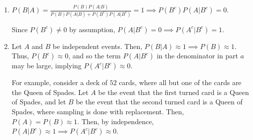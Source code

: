 \begin{enumerate}[label=(\alph*)]

\item 
$P(B|A) = \frac{P(B)P(A|B)}{P(B)P(A|B) + P(B^{c})P(A|B^{c})} = 1 \implies P(B^{c})P(A|B^{c}) = 0$.

Since $P(B^{c}) \neq 0$ by assumption, $P(A|B^{c}) = 0 \implies P(A^{c}|B^{c}) = 1$.

\item Let $A$ and $B$ be independent events. Then, $P(B|A) \approx 1 \implies P(B) \approx 1$.
Thus, $P(B^{c}) \approx 0$, and so the term $P(A|B^{c})$ in the denominator in part $a$ may be large,
implying $P(A^{c}|B^{c}) \approx 0$.

For example, consider a deck of $52$ cards, where all but one of the cards are the Queen of Spades.
Let $A$ be the event that the first turned card is a Queen of Spades, and let $B$ be the event that the
second turned card is a Queen of Spades, where sampling is done with replacement. Then, $P(A) = P(B) \approx 1$.
Then, by independence, $P(A|B^{c}) \approx 1 \implies P(A^{c}|B^{c}) \approx 0$.
\end{enumerate}